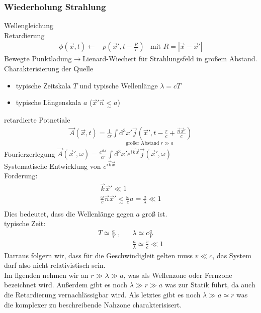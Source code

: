 \documentclass[a4paper]{article}
\begin{document}
\subsubsection{Wiederholung Strahlung}
Wellengleichung\\
Retardierung
\begin{align}
\phi(\vec{x},t)\longleftarrow&\rho(\vec{x}',t-\frac{R}{c})
&\text{mit }R=|\vec{x}-\vec{x}'| 
\end{align}
Bewegte Punktladung$\rightarrow$Lienard-Wiechert für Strahlungsfeld in großem
Abstand.\\
Charakterisierung der Quelle\\
\begin{itemize}
  \item typische Zeitskala $T$ und typische Wellenlänge $\lambda=cT$
  \item typische Längenskala $a$ ($\vec{x}'\vec{n}\underset{\sim}{<}a$)
\end{itemize}
retardierte Potnetiale
\begin{align}
\vec{A}(\vec{x},t)=\underset{\text{großer Abstand } r\gg a}{
\frac{1}{cr}\int\mathrm{d}^3x'
\vec{j}(\vec{x}',t-\frac{r}{c}+\frac{\vec{n}\vec{x}'}{c})} 
\end{align}
Fourierzerlegung
$\vec{A}(\vec{x}',\omega)=\frac{e^{ikr}}{cr}\int\mathrm{d}^3x'e^{i\vec{k}\vec{x}}\vec{j}(\vec{x}',\omega)$\\
Systematische Entwicklung von $e^{i\vec{k}\vec{x}}$\\
Forderung: \begin{align}
\vec{k}\vec{x}'\ll1\\
\frac{\omega}{c}\vec{n}\vec{x}'\underset{\sim}{<}\frac{\omega}{c}a=\frac{a}{\lambda}\ll1\\
\end{align}
Dies bedeutet, dass die Wellenlänge gegen $a$ groß ist.\\
typische Zeit:
\begin{align}
T\simeq \frac{a}{V}\text{ , }\ \ \ &\lambda\simeq c\frac{a}{V}\\
&\frac{a}{\lambda}\simeq\frac{v}{c}\ll1
\end{align}
Darraus folgern wir, dass für die Geschwindigleit gelten muss $v\ll c$, das
System darf also nicht relativistisch sein.\\
Im flgenden nehmen wir an $r\gg\lambda\gg a$, was als Wellenzone oder Fernzone
bezeichnet wird. Außerdem gibt es noch $\lambda\gg r\gg a$ was zur Statik führt,
da auch die Retardierung vernachlässigbar wird. Als letztes gibt es noch
$\lambda \gg a \simeq r$ was die komplexer zu beschreibende Nahzone
charakterisisert.\\
\end{document}
